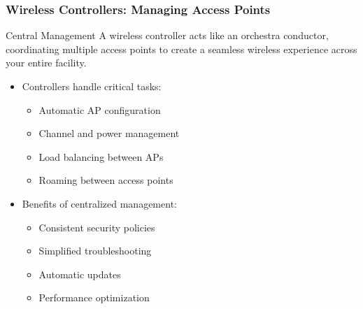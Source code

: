 \documentclass{beamer}
\begin{document}
\begin{frame}
    \frametitle{Wireless Controllers: Managing Access Points}
    
    \begin{alertblock}{Central Management}
        A wireless controller acts like an orchestra conductor, coordinating multiple access points to create a seamless wireless experience across your entire facility.
    \end{alertblock}
    
    \begin{itemize}
        \item Controllers handle critical tasks:
        \begin{itemize}
            \item Automatic AP configuration
            \item Channel and power management
            \item Load balancing between APs
            \item Roaming between access points
        \end{itemize}
        
        \item Benefits of centralized management:
        \begin{itemize}
            \item Consistent security policies
            \item Simplified troubleshooting
            \item Automatic updates
            \item Performance optimization
        \end{itemize}
    \end{itemize}
\end{frame}
\end{document}
